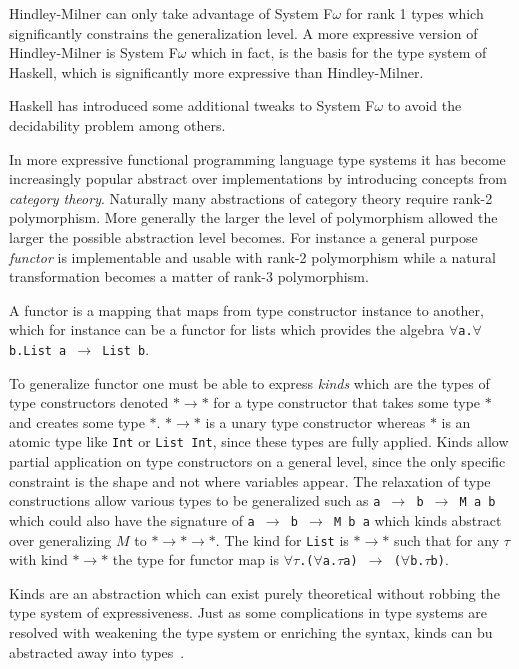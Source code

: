 \documentclass[11pt,oneside,a4paper]{report}
\begin{document}
Hindley-Milner can only take advantage of System F\underline{$\omega$} for rank 1 types which significantly constrains the generalization level.
A more expressive version of Hindley-Milner is System F$\omega$ which in fact, is the basis for the type system of Haskell, which is significantly more expressive than Hindley-Milner.
\begin{remark}
    Haskell has introduced some additional tweaks to System F$\omega$ to avoid the decidability problem among others.
\end{remark}

In more expressive functional programming language type systems it has become increasingly popular abstract over implementations by introducing concepts from \textit{category theory}.
Naturally many abstractions of category theory require rank-2 polymorphism.
More generally the larger the level of polymorphism allowed the larger the possible abstraction level becomes.
For instance a general purpose \textit{functor} is implementable and usable with rank-2 polymorphism while a natural transformation becomes a matter of rank-3 polymorphism.
\begin{remark}
    A functor is a mapping that maps from type constructor instance to another, which for instance can be a functor for lists which provides the algebra \texttt{$\forall$a.$\forall$b.List a $\rightarrow$ List b}.
\end{remark}
\noindent To generalize functor one must be able to express \textit{kinds} which are the types of type constructors denoted $* \rightarrow *$ for a type constructor that takes some type $*$ and creates some type $*$.
$* \rightarrow *$ is a unary type constructor whereas $*$ is an atomic type like \texttt{Int} or \texttt{List Int}, since these types are fully applied.
Kinds allow partial application on type constructors on a general level, since the only specific constraint is the shape and not where variables appear.
The relaxation of type constructions allow various types to be generalized such as \texttt{a $\rightarrow$ b $\rightarrow$ M a b} which could also have the signature of \texttt{a $\rightarrow$ b $\rightarrow$ M b a} which kinds abstract over generalizing $M$ to $* \rightarrow * \rightarrow *$.
The kind for \texttt{List} is $* \rightarrow *$ such that for any $\tau$ with kind $* \rightarrow *$ the type for functor map is \texttt{$\forall\tau$.($\forall$a.$\tau$a) $\rightarrow$ ($\forall$b.$\tau$b)}.
\begin{remark}
    Kinds are an abstraction which can exist purely theoretical without robbing the type system of expressiveness.
    Just as some complications in type systems are resolved with weakening the type system or enriching the syntax, kinds can bu abstracted away into types~\cite{weirich2013system}.
\end{remark}
\end{document}
